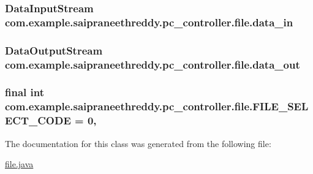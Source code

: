\subsubsection[{\texorpdfstring{data\+\_\+in}{data_in}}]{\setlength{\rightskip}{0pt plus 5cm}Data\+Input\+Stream com.\+example.\+saipraneethreddy.\+pc\+\_\+controller.\+file.\+data\+\_\+in\hspace{0.3cm}{\ttfamily [package]}}\hypertarget{classcom_1_1example_1_1saipraneethreddy_1_1pc__controller_1_1file_a47d57ff1da03206753afb5add3f4ee30}{}\label{classcom_1_1example_1_1saipraneethreddy_1_1pc__controller_1_1file_a47d57ff1da03206753afb5add3f4ee30}
\subsubsection[{\texorpdfstring{data\+\_\+out}{data_out}}]{\setlength{\rightskip}{0pt plus 5cm}Data\+Output\+Stream com.\+example.\+saipraneethreddy.\+pc\+\_\+controller.\+file.\+data\+\_\+out\hspace{0.3cm}{\ttfamily [package]}}\hypertarget{classcom_1_1example_1_1saipraneethreddy_1_1pc__controller_1_1file_ab8b6604ef819fb1d12f4b89cda005679}{}\label{classcom_1_1example_1_1saipraneethreddy_1_1pc__controller_1_1file_ab8b6604ef819fb1d12f4b89cda005679}
\subsubsection[{\texorpdfstring{F\+I\+L\+E\+\_\+\+S\+E\+L\+E\+C\+T\+\_\+\+C\+O\+DE}{FILE_SELECT_CODE}}]{\setlength{\rightskip}{0pt plus 5cm}final int com.\+example.\+saipraneethreddy.\+pc\+\_\+controller.\+file.\+F\+I\+L\+E\+\_\+\+S\+E\+L\+E\+C\+T\+\_\+\+C\+O\+DE = 0\hspace{0.3cm}{\ttfamily [static]}, {\ttfamily [private]}}\hypertarget{classcom_1_1example_1_1saipraneethreddy_1_1pc__controller_1_1file_a2692c8c00c3f94885c1ae5f3088973da}{}\label{classcom_1_1example_1_1saipraneethreddy_1_1pc__controller_1_1file_a2692c8c00c3f94885c1ae5f3088973da}


The documentation for this class was generated from the following file\+:\begin{DoxyCompactItemize}
\item 
\hyperlink{file_8java}{file.\+java}\end{DoxyCompactItemize}
